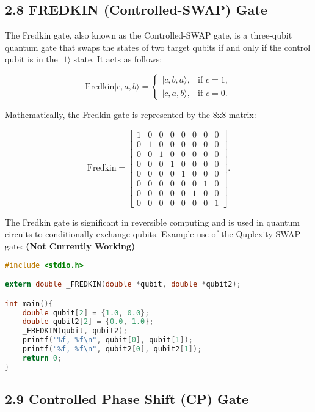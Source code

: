 \documentclass{article}
\begin{document}
\subsection*{2.8 FREDKIN (Controlled-SWAP) Gate}
The Fredkin gate, also known as the Controlled-SWAP gate, is a three-qubit quantum gate that swaps the states of two target qubits if and only if the control qubit is in the \(|1\rangle\) state. It acts as follows:

\[
\text{Fredkin}|c, a, b\rangle = \begin{cases}
|c, b, a\rangle, & \text{if } c = 1, \\
|c, a, b\rangle, & \text{if } c = 0.
\end{cases}
\]

Mathematically, the Fredkin gate is represented by the 8x8 matrix:

\[
\text{Fredkin} = \begin{bmatrix}
1 & 0 & 0 & 0 & 0 & 0 & 0 & 0 \\
0 & 1 & 0 & 0 & 0 & 0 & 0 & 0 \\
0 & 0 & 1 & 0 & 0 & 0 & 0 & 0 \\
0 & 0 & 0 & 1 & 0 & 0 & 0 & 0 \\
0 & 0 & 0 & 0 & 1 & 0 & 0 & 0 \\
0 & 0 & 0 & 0 & 0 & 0 & 1 & 0 \\
0 & 0 & 0 & 0 & 0 & 1 & 0 & 0 \\
0 & 0 & 0 & 0 & 0 & 0 & 0 & 1
\end{bmatrix}.
\]

The Fredkin gate is significant in reversible computing and is used in quantum circuits to conditionally exchange qubits.
Example use of the Quplexity SWAP gate: \textbf{(Not Currently Working)}

\begin{lstlisting}[language=C, frame=single]
#include <stdio.h>

extern double _FREDKIN(double *qubit, double *qubit2);

int main(){
    double qubit[2] = {1.0, 0.0};
    double qubit2[2] = {0.0, 1.0};
    _FREDKIN(qubit, qubit2);
    printf("%f, %f\n", qubit[0], qubit[1]);
    printf("%f, %f\n", qubit2[0], qubit2[1]);
    return 0;
}
\end{lstlisting}

\subsection*{2.9 Controlled Phase Shift (CP) Gate}
\end{document}
